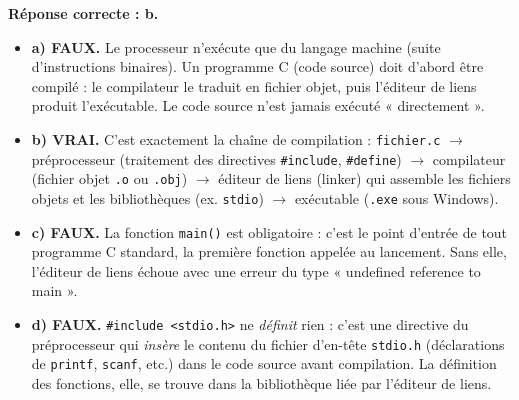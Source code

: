 \documentclass[11pt]{article}
\newcommand{\cle}[1]{{\popxbold\color{popdark}#1}}
\begin{document}
\begin{corrige}
\textbf{Réponse correcte : b.}

\begin{itemize}
    \item \textbf{a) FAUX.} Le processeur n'exécute que du langage machine (suite d'instructions binaires). Un programme C (code source) doit d'abord être \cle{compilé} : le compilateur le traduit en fichier objet, puis l'éditeur de liens produit l'exécutable. Le code source n'est jamais exécuté « directement ».
    \item \textbf{b) VRAI.} C'est exactement la chaîne de compilation : \texttt{fichier.c} $\rightarrow$ préprocesseur (traitement des directives \texttt{\#include}, \texttt{\#define}) $\rightarrow$ compilateur (fichier objet \texttt{.o} ou \texttt{.obj}) $\rightarrow$ éditeur de liens (linker) qui assemble les fichiers objets et les bibliothèques (ex. \texttt{stdio}) $\rightarrow$ exécutable (\texttt{.exe} sous Windows).
    \item \textbf{c) FAUX.} La fonction \texttt{main()} est \cle{obligatoire} : c'est le point d'entrée de tout programme C standard, la première fonction appelée au lancement. Sans elle, l'éditeur de liens échoue avec une erreur du type « undefined reference to main ».
    \item \textbf{d) FAUX.} \texttt{\#include <stdio.h>} ne \emph{définit} rien : c'est une directive du préprocesseur qui \emph{insère} le contenu du fichier d'en-tête \texttt{stdio.h} (déclarations de \texttt{printf}, \texttt{scanf}, etc.) dans le code source avant compilation. La définition des fonctions, elle, se trouve dans la bibliothèque liée par l'éditeur de liens.
\end{itemize}
\end{corrige}
\end{document}
